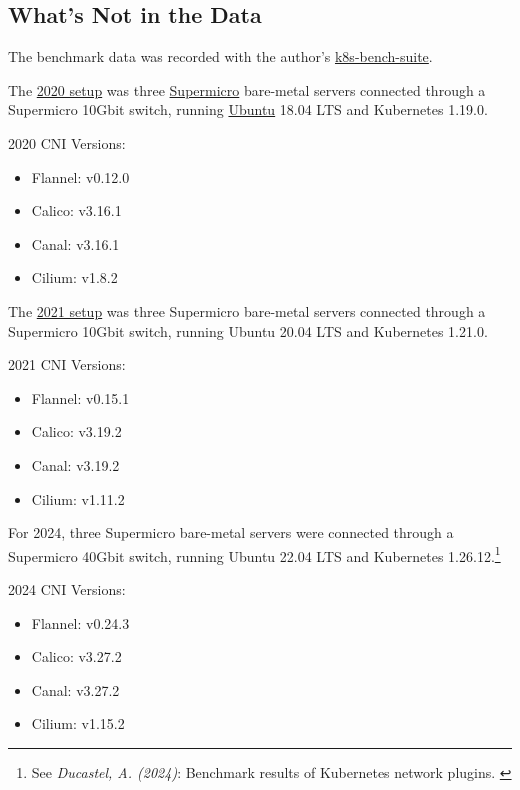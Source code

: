 \subsection{What's Not in the Data}

The benchmark data was recorded with the author's \href{https://github.com/InfraBuilder/k8s-bench-suite}{k8s-bench-suite}.

The \href{https://github.com/InfraBuilder/benchmark-k8s-cni-2020-08/blob/master/PROTOCOL.md}{2020 setup} was three \href{https://www.supermicro.com/en/}{Supermicro} bare-metal servers connected through a Supermicro 10Gbit switch, running \href{https://ubuntu.com/server}{Ubuntu} 18.04 LTS and Kubernetes 1.19.0.

2020 CNI Versions:
\begin{itemize}
    \item Flannel: v0.12.0
    \item Calico: v3.16.1
    \item Canal: v3.16.1
    \item Cilium: v1.8.2
\end{itemize}

The \href{https://github.com/InfraBuilder/benchmark-k8s-cni-2021-05/blob/main/PROTOCOL.md}{2021 setup} was three Supermicro bare-metal servers connected through a Supermicro 10Gbit switch, running Ubuntu 20.04 LTS and Kubernetes 1.21.0.

2021 CNI Versions:
\begin{itemize}
    \item Flannel: v0.15.1
    \item Calico: v3.19.2
    \item Canal: v3.19.2
    \item Cilium: v1.11.2
\end{itemize}

For 2024, three Supermicro bare-metal servers were connected through a Supermicro 40Gbit switch, running Ubuntu 22.04 LTS and Kubernetes 1.26.12.\footnote{See \textit{Ducastel, A. (2024)}: Benchmark results of Kubernetes network plugins. \cite{originalArticle}}

2024 CNI Versions:
\begin{itemize}
    \item Flannel: v0.24.3
    \item Calico: v3.27.2
    \item Canal: v3.27.2
    \item Cilium: v1.15.2
\end{itemize}

